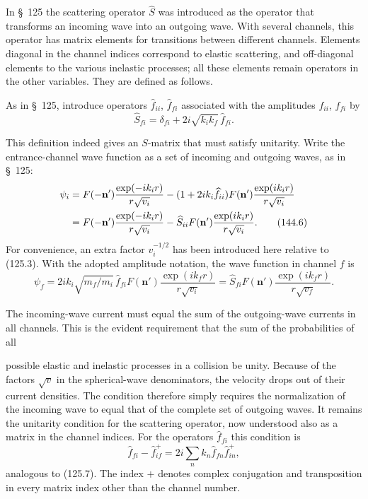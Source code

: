 In \S~125 the scattering operator $\widehat S$ was introduced as the operator
that transforms an incoming wave into an outgoing wave. With several
channels, this operator has matrix elements for transitions between different
channels. Elements diagonal in the channel indices correspond to elastic
scattering, and off-diagonal elements to the various inelastic processes;
all these elements remain operators in the other variables. They are defined
as follows.

As in \S~125, introduce operators $\widehat f_{ii}$, $\widehat f_{fi}$
associated with the amplitudes $f_{ii}$, $f_{fi}$ by
\begin{equation}
 \widehat S_{fi}=\delta_{fi}+2i\sqrt{k_ik_f}\,\widehat f_{fi}.
 \tag{144.5}
\end{equation}

This definition indeed gives an $S$-matrix that must satisfy unitarity. Write
the entrance-channel wave function as a set of incoming and outgoing waves,
as in \S~125:
\begin{align}
 \psi_i&=F(-\mathbf n')\frac{\exp(-ik_i r)}{r\sqrt{v_i}}
 -(1+2ik_i\widehat f_{ii})F(\mathbf n')\frac{\exp(ik_i r)}{r\sqrt{v_i}}\notag\\
 &=F(-\mathbf n')\frac{\exp(-ik_i r)}{r\sqrt{v_i}}
 -\widehat S_{ii}F(\mathbf n')\frac{\exp(ik_i r)}{r\sqrt{v_i}}.
 \tag{144.6}
\end{align}
For convenience, an extra factor $v_i^{-1/2}$ has been introduced here
relative to (125.3). With the adopted amplitude notation, the wave function
in channel $f$ is
\begin{equation}
 \psi_f=2ik_i\sqrt{m_f/m_i}\,\widehat f_{fi}F(\mathbf n')
 \frac{\exp(ik_f r)}{r\sqrt{v_i}}
 =\widehat S_{fi}F(\mathbf n')\frac{\exp(ik_f r)}{r\sqrt{v_f}}.
 \tag{144.7}
\end{equation}

The incoming-wave current must equal the sum of the outgoing-wave currents in
all channels. This is the evident requirement that the sum of the
probabilities of all

possible elastic and inelastic processes in a collision be unity. Because of
the factors $\sqrt v$ in the spherical-wave denominators, the velocity drops
out of their current densities. The condition therefore simply requires the
normalization of the incoming wave to equal that of the complete set of
outgoing waves. It remains the unitarity condition for the scattering
operator, now understood also as a matrix in the channel indices. For the
operators $\widehat f_{fi}$ this condition is
\begin{equation}
 \widehat f_{fi}-\widehat f_{if}^{+}
 =2i\sum_n k_n\widehat f_{fn}\widehat f_{in}^{+},
 \tag{144.8}
\end{equation}
analogous to (125.7). The index $+$ denotes complex conjugation and
transposition in every matrix index other than the channel number.

